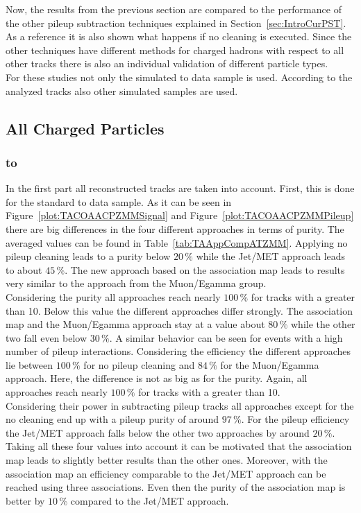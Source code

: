 Now, the results from the previous section are compared to the performance of the other pileup subtraction techniques explained in Section~\ref{sec:IntroCurPST}. As a reference it is also shown what happens if no cleaning is executed. Since the other techniques have different methods for charged hadrons with respect to all other tracks there is also an individual validation of different particle types. \\
For these studies not only the simulated \Zz to \MM data sample is used. According to the analyzed tracks also other simulated samples are used.

\subsection{All Charged Particles \label{sec:TASEFRDACP}}

\subsubsection{\Zz to \MM \label{sec:TASEFRDACPZMM}}
In the first part all reconstructed tracks are taken into account. First, this is done for the standard \Zz to \MM data sample. As it can be seen in Figure~\ref{plot:TACOAACPZMMSignal} and Figure~\ref{plot:TACOAACPZMMPileup} there are big differences in the four different approaches in terms of purity. The averaged values can be found in Table~\ref{tab:TAAppCompATZMM}. Applying no pileup cleaning leads to a purity below $20\,\%$ while the Jet/MET approach leads to about $45\,\%$. The new approach based on the association map leads to results very similar to the approach from the Muon/Egamma group. \\
Considering the purity all approaches reach nearly $100\,\%$ for tracks with a \pt greater than 10\GeV. Below this value the different approaches differ strongly. The association map and the Muon/Egamma approach stay at a value about $80\,\%$ while the other two fall even below $30\,\%$. A similar behavior can be seen for events with a high number of pileup interactions. Considering the efficiency the different approaches lie between $100\,\%$ for no pileup cleaning and $84\,\%$ for the Muon/Egamma approach. Here, the difference is not as big as for the purity. Again, all approaches reach nearly $100\,\%$ for tracks with a \pt greater than 10\GeV. \\
Considering their power in subtracting pileup tracks all approaches except for the no cleaning end up with a pileup purity of around $97\,\%$. For the pileup efficiency the Jet/MET approach falls below the other two approaches by around $20\,\%$.\\
Taking all these four values into account it can be motivated that the association map leads to slightly better results than the other ones. Moreover, with the association map an efficiency comparable to the Jet/MET approach can be reached using three associations. Even then the purity of the association map is better by $10\,\%$ compared to the Jet/MET approach.


